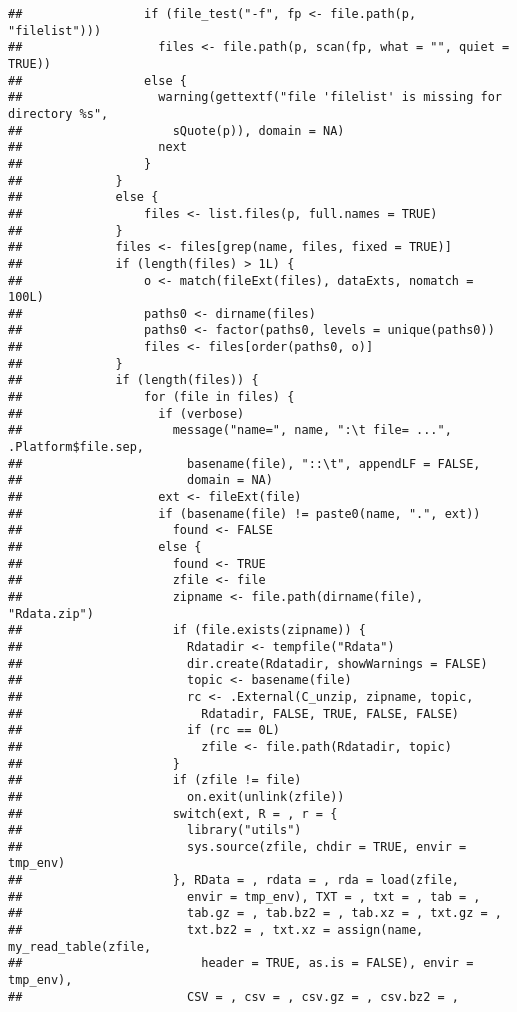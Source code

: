 \documentclass[
]{book}
\begin{document}
\begin{verbatim}
##                 if (file_test("-f", fp <- file.path(p, "filelist"))) 
##                   files <- file.path(p, scan(fp, what = "", quiet = TRUE))
##                 else {
##                   warning(gettextf("file 'filelist' is missing for directory %s", 
##                     sQuote(p)), domain = NA)
##                   next
##                 }
##             }
##             else {
##                 files <- list.files(p, full.names = TRUE)
##             }
##             files <- files[grep(name, files, fixed = TRUE)]
##             if (length(files) > 1L) {
##                 o <- match(fileExt(files), dataExts, nomatch = 100L)
##                 paths0 <- dirname(files)
##                 paths0 <- factor(paths0, levels = unique(paths0))
##                 files <- files[order(paths0, o)]
##             }
##             if (length(files)) {
##                 for (file in files) {
##                   if (verbose) 
##                     message("name=", name, ":\t file= ...", .Platform$file.sep, 
##                       basename(file), "::\t", appendLF = FALSE, 
##                       domain = NA)
##                   ext <- fileExt(file)
##                   if (basename(file) != paste0(name, ".", ext)) 
##                     found <- FALSE
##                   else {
##                     found <- TRUE
##                     zfile <- file
##                     zipname <- file.path(dirname(file), "Rdata.zip")
##                     if (file.exists(zipname)) {
##                       Rdatadir <- tempfile("Rdata")
##                       dir.create(Rdatadir, showWarnings = FALSE)
##                       topic <- basename(file)
##                       rc <- .External(C_unzip, zipname, topic, 
##                         Rdatadir, FALSE, TRUE, FALSE, FALSE)
##                       if (rc == 0L) 
##                         zfile <- file.path(Rdatadir, topic)
##                     }
##                     if (zfile != file) 
##                       on.exit(unlink(zfile))
##                     switch(ext, R = , r = {
##                       library("utils")
##                       sys.source(zfile, chdir = TRUE, envir = tmp_env)
##                     }, RData = , rdata = , rda = load(zfile, 
##                       envir = tmp_env), TXT = , txt = , tab = , 
##                       tab.gz = , tab.bz2 = , tab.xz = , txt.gz = , 
##                       txt.bz2 = , txt.xz = assign(name, my_read_table(zfile, 
##                         header = TRUE, as.is = FALSE), envir = tmp_env), 
##                       CSV = , csv = , csv.gz = , csv.bz2 = , 

\end{verbatim}
\end{document}
